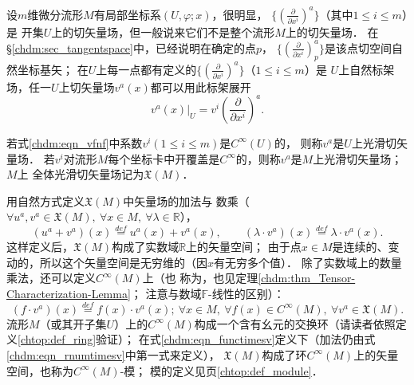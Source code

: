 设$m$维微分流形$M$有局部坐标系$(U,\varphi;x)$，很明显，
$\{(\frac{\partial }{\partial x^i})^a\}$（其中$1\leqslant i \leqslant m$）是
开集$U$上的切矢量场，但一般说来它们不是整个流形$M$上的切矢量场．
在\S\ref{chdm:sec_tangentspace}中，已经说明在确定的点$p$，
$\{(\frac{\partial }{\partial x^i})^a_p\}$是该点切空间自然坐标基矢；
在$U$上每一点都有定义的$\{(\frac{\partial }{\partial x^i})^a\}$（$1\leqslant i \leqslant m$）是
$U$上{\heiti 自然标架场}，任一$U$上切矢量场$v^a(x)$都可以用此标架展开
\begin{equation}\label{chdm:eqn_vfnf}
    v^a(x)|_U = v^i \left(\frac{\partial }{\partial x^i}\right)^a .
\end{equation}


\begin{definition}
    若式\eqref{chdm:eqn_vfnf}中系数$v^i(1\leqslant i \leqslant m)$是$C^\infty(U)$的，
    则称$v^a$是$U$上{\heiti 光滑切矢量场}．
    若$v^i$对流形$M$每个坐标卡中开覆盖是$C^\infty$的，则称$v^a$是$M$上{\heiti 光滑切矢量场}；$M$上
    全体光滑切矢量场记为$\mathfrak{X}(M)$．
\end{definition}
用自然方式定义$\mathfrak{X}(M)$中矢量场的加法与
数乘（$\forall u^a,v^a \in \mathfrak{X}(M),\  \forall x\in M, \  \forall \lambda \in \mathbb{R}$），
\begin{equation}\label{chdm:eqn_rnumtimesv}
    (u^a+v^a)(x) \overset{def}{=} u^a(x) + v^a(x), \qquad 
    (\lambda \cdot v^a)(x) \overset{def}{=} \lambda\cdot v^a(x).
\end{equation}
这样定义后，$\mathfrak{X}(M)$构成了实数域$\mathbb{R}$上的矢量空间；
由于点$x\in M$是连续的、变动的，所以这个矢量空间是无穷维的（因$x$有无穷多个值）．
除了实数域上的数量乘法，还可以定义$C^\infty(M)$上（也
称为，也见定理\ref{chdm:thm_Tensor-Characterization-Lemma}；
注意与数域$\mathbb{F}$-线性的区别）：
\begin{equation}\label{chdm:eqn_functimesv}
    (f \cdot v^a)(x) \overset{def}{=} f(x)\cdot v^a(x); \
    \forall x\in M, \ \forall f(x) \in C^\infty(M), \ \forall v^a \in \mathfrak{X}(M) .
\end{equation}
流形$M$（或其开子集$U$）上的$C^\infty(M)$构成一个含有幺元的交换环（请读者依照定义\ref{chtop:def_ring}验证）；
在式\eqref{chdm:eqn_functimesv}定义下（加法仍由式\eqref{chdm:eqn_rnumtimesv}中第一式来定义），
$\mathfrak{X}(M)$构成了环$C^\infty(M)$上的矢量空间，也称为$C^\infty(M)$-模；
模的定义见\pageref{chtop:def_module}页\ref{chtop:def_module}．

